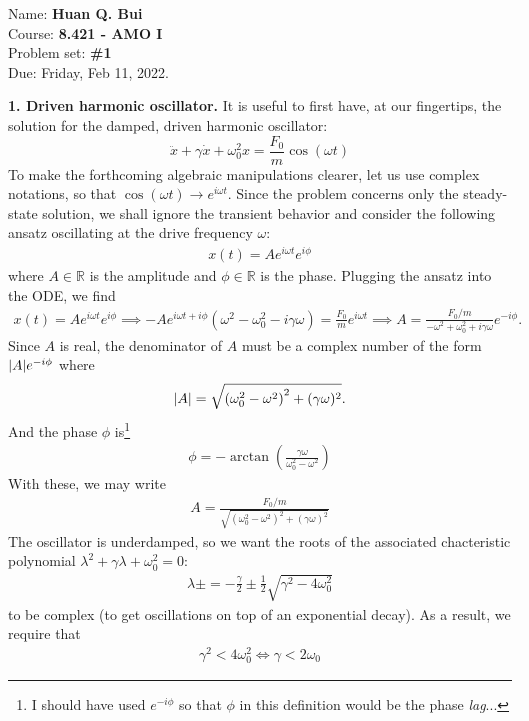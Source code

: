 \documentclass{article}
\theoremstyle{definition}
\newcommand{\f}[2]{\frac{#1}{#2}}
\newcommand{\lp}{\left(}
\newcommand{\rp}{\right)}
\begin{document}
\begin{framed}
\noindent Name: \textbf{Huan Q. Bui}\\
Course: \textbf{8.421 - AMO I}\\
Problem set: \textbf{\#1}\\
Due: Friday, Feb 11, 2022.
\end{framed}
	
	
\noindent \textbf{1. Driven harmonic oscillator.} It is useful to first have, at our fingertips, the solution for the damped, driven harmonic oscillator:
\begin{equation*}
\ddot x + \gamma \dot x + \omega_0^2 x = \f{F_0}{m}\cos(\omega t)
\end{equation*}
To make the forthcoming algebraic manipulations clearer, let us use complex notations, so that $\cos(\omega t) \to e^{i\omega t}$. Since the problem concerns only the steady-state solution, we shall ignore the transient behavior and consider the following ansatz oscillating at the drive frequency $\omega$:
\begin{align*}
x(t) = A e^{i\omega t } e^{i\phi}
\end{align*}
where $A \in \mathbb{R}$ is the amplitude and $\phi \in \mathbb{R}$ is the phase. Plugging the ansatz into the ODE, we find 
\begin{align*}
x(t) = A e^{i\omega t} e^{i\phi} \implies -A e^{i \omega t + i\phi} \lp \omega^2 -\omega_0^2 - i\gamma \omega \rp = \f{F_0}{m}e^{i\omega t} \implies A = \f{F_0/m}{-\omega^2 + \omega_0^2 + i\gamma \omega} e^{-i\phi}.
\end{align*}
Since $A$ is real, the denominator of $A$ must be a complex number of the form $\abs{A} e^{-i\phi}$ where
\begin{align*}
\abs{A} = \sqrt{{(\omega_0^2 - \omega^2)}^2 + (\gamma \omega)^2}.
\end{align*}
And the phase $\phi$ is\footnote{I should have used $e^{-i\phi}$ so that $\phi$ in this definition would be the phase \textit{lag}...}
\begin{align*}
\boxed{\phi = -\arctan(\f{\gamma\omega}{\omega_0^2 - \omega^2})}
\end{align*}
With these, we may write
\begin{align*}
\boxed{A = \f{F_0/m}{\sqrt{(\omega_0^2 - \omega^2)^2 + (\gamma \omega)^2}}}
\end{align*}
The oscillator is underdamped, so we want the roots of the associated chacteristic polynomial $\lambda^2 + \gamma \lambda + \omega_0^2 = 0$:
\begin{align*}
\lambda\pm = -\f{\gamma}{2} \pm \f{1}{2}\sqrt{\gamma^2 - 4\omega_0^2}
\end{align*}
to be complex (to get oscillations on top of an exponential decay). As a result, we require that 
\begin{align*}
\gamma^2 < 4\omega_0^2 \iff \boxed{\gamma < 2\omega_0}
\end{align*}
\end{document}
